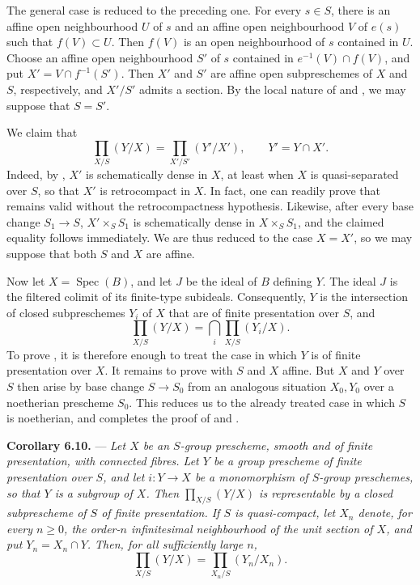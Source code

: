The general case is reduced to the preceding one.  For every
\(s\in S\), there is an affine open neighbourhood \(U\) of \(s\)
and an affine open neighbourhood \(V\) of \(e(s)\) such that
\(f(V)\subset U\).  Then \(f(V)\) is an open neighbourhood of \(s\)
contained in \(U\).  Choose an affine open neighbourhood \(S'\) of
\(s\) contained in \(e^{-1}(V)\cap f(V)\), and put
\(X'=V\cap f^{-1}(S')\).  Then \(X'\) and \(S'\) are affine open
subpreschemes of \(X\) and \(S\), respectively, and \(X'/S'\)
admits a section.  By the local nature of
 and
, we may suppose that
\(S=S'\).

We claim that
\[
  \prod_{X/S}(Y/X)=\prod_{X'/S'}(Y'/X'),
  \qquad Y'=Y\cap X'.
\]
Indeed, by , \(X'\) is schematically dense in \(X\),
at least when \(X\) is quasi-separated over \(S\), so that \(X'\)
is retrocompact in \(X\).  In fact, one can readily prove that
 remains valid without the retrocompactness
hypothesis.  Likewise, after every base change \(S_1\to S\),
\(X'\times_SS_1\) is schematically dense in \(X\times_SS_1\), and
the claimed equality follows immediately.  We are thus reduced to
the case \(X=X'\), so we may suppose that both \(S\) and \(X\) are
affine.

Now let \(X=\operatorname{Spec}(B)\), and let \(J\) be the ideal of
\(B\) defining \(Y\).  The ideal \(J\) is the filtered colimit of
its finite-type subideals.  Consequently, \(Y\) is the intersection
of closed subpreschemes \(Y_i\) of \(X\) that are of finite
presentation over \(S\), and
\[
  \prod_{X/S}(Y/X)
  =
  \bigcap_i\prod_{X/S}(Y_i/X).
\]
To prove , it is therefore
enough to treat the case in which \(Y\) is of finite presentation
over \(X\).  It remains to prove
 with \(S\) and \(X\)
affine.  But \(X\) and \(Y\) over \(S\) then arise by base change
\(S\to S_0\) from an analogous situation \(X_0,Y_0\) over a
noetherian prescheme \(S_0\).  This reduces us to the already treated
case in which \(S\) is noetherian, and completes the proof of
 and
.

\medskip
\noindent{}\textbf{Corollary 6.10.}
---
\textit{Let \(X\) be an \(S\)-group prescheme, smooth and of finite
presentation, with connected fibres.  Let \(Y\) be a group
prescheme of finite presentation over \(S\), and let \(i:Y\to X\)
be a monomorphism of \(S\)-group preschemes, so that \(Y\) is a
subgroup of \(X\).  Then \(\prod_{X/S}(Y/X)\) is representable by a
closed subprescheme of \(S\) of finite presentation.  If \(S\) is
quasi-compact, let \(X_n\) denote, for every \(n\geq0\), the
order-\(n\) infinitesimal neighbourhood of the unit section of
\(X\), and put \(Y_n=X_n\cap Y\).  Then, for all sufficiently large
\(n\),}
\[
  \prod_{X/S}(Y/X)=\prod_{X_n/S}(Y_n/X_n).
\]

